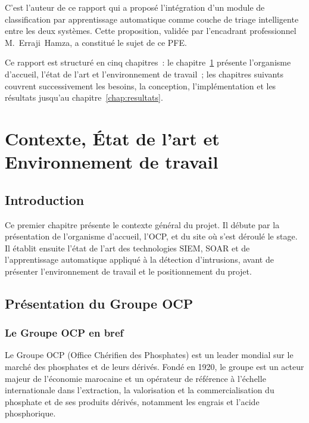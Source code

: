 \documentclass[12pt,a4paper]{report}
\begin{document}
C'est l'auteur de ce rapport qui a proposé l'intégration d'un module de classification par apprentissage automatique comme couche de triage intelligente entre les deux systèmes. Cette proposition, validée par l'encadrant professionnel M.~Erraji~Hamza, a constitué le sujet de ce PFE.

Ce rapport est structuré en cinq chapitres~: le chapitre~\ref{chap:contexte} présente l'organisme d'accueil, l'état de l'art et l'environnement de travail~; les chapitres suivants couvrent successivement les besoins, la conception, l'implémentation et les résultats jusqu'au chapitre~\ref{chap:resultats}.

\chapter{Contexte, État de l'art et Environnement de travail}
\label{chap:contexte}

\section*{Introduction}
Ce premier chapitre présente le contexte général du projet.
Il débute par la présentation de l'organisme d'accueil, l'OCP,
et du site où s'est déroulé le stage. Il établit ensuite l'état
de l'art des technologies SIEM, SOAR et de l'apprentissage
automatique appliqué à la détection d'intrusions, avant de
présenter l'environnement de travail et le positionnement
du projet.

\section{Présentation du Groupe OCP}

\subsection{Le Groupe OCP en bref}

Le Groupe OCP (Office Chérifien des Phosphates) est un leader
mondial sur le marché des phosphates et de leurs dérivés.
Fondé en 1920, le groupe est un acteur majeur de l'économie
marocaine et un opérateur de référence à l'échelle
internationale dans l'extraction, la valorisation et la
commercialisation du phosphate et de ses produits dérivés,
notamment les engrais et l'acide phosphorique.
\end{document}
